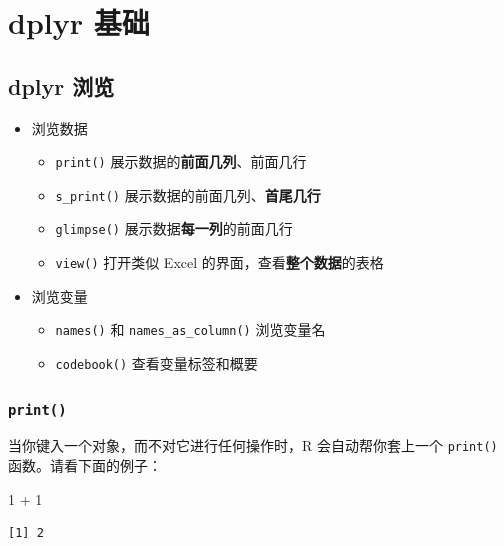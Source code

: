 \documentclass[
  letterpaper,
]{ctexbook}
\newenvironment{Shaded}{\begin{snugshade}}{\end{snugshade}}
\newcommand{\DecValTok}[1]{\textcolor[rgb]{0.68,0.00,0.00}{#1}}
\newcommand{\SpecialCharTok}[1]{\textcolor[rgb]{0.37,0.37,0.37}{#1}}
\providecommand{\tightlist}{%
  \setlength{\itemsep}{0pt}\setlength{\parskip}{0pt}}\usepackage{longtable,booktabs,array}
\begin{document}
\part{dplyr 基础}

\hypertarget{dplyr-ux6d4fux89c8}{%
\chapter{dplyr 浏览}\label{dplyr-ux6d4fux89c8}}

\begin{itemize}
\tightlist
\item
  浏览数据

  \begin{itemize}
  \tightlist
  \item
    \texttt{print()} 展示数据的{\textbf{前面几列}}、前面几行
  \item
    \texttt{s\_print()} 展示数据的前面几列、{\textbf{首尾几行}}
  \item
    \texttt{glimpse()} 展示数据{\textbf{每一列}}的前面几行
  \item
    \texttt{view()} 打开类似 Excel 的界面，查看{\textbf{整个数据}}的表格
  \end{itemize}
\item
  浏览变量

  \begin{itemize}
  \tightlist
  \item
    \texttt{names()} 和 \texttt{names\_as\_column()} 浏览变量名
  \item
    \texttt{codebook()} 查看变量标签和概要
  \end{itemize}
\end{itemize}

\hypertarget{print}{%
\section{\texorpdfstring{\texttt{print()}}{print()}}\label{print}}

当你键入一个对象，而不对它进行任何操作时，R 会自动帮你套上一个
\texttt{print()} 函数。请看下面的例子：

\begin{Shaded}
\begin{Highlighting}[]
\DecValTok{1} \SpecialCharTok{+} \DecValTok{1}
\end{Highlighting}
\end{Shaded}

\begin{verbatim}
[1] 2
\end{verbatim}
\end{document}
